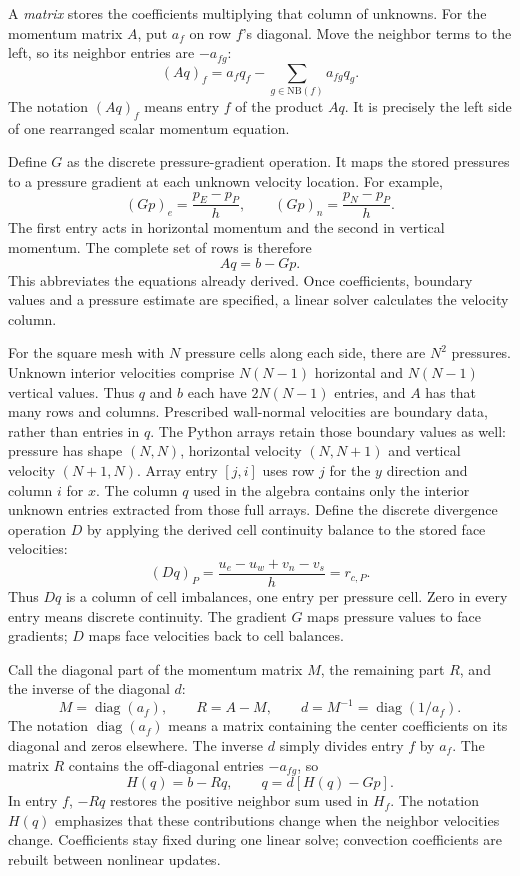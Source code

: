 A \emph{matrix} stores the coefficients multiplying that column of unknowns.
For the momentum matrix $A$, put $a_f$ on row $f$'s diagonal. Move the neighbor
terms to the left, so its neighbor entries are $-a_{fg}$:
\[
(Aq)_f=a_fq_f-\sum_{g\in\mathrm{NB}(f)}a_{fg}q_g.
\]
The notation $(Aq)_f$ means entry $f$ of the product $Aq$. It is precisely
the left side of one rearranged scalar momentum equation.

Define $G$ as the discrete pressure-gradient operation. It maps the stored
pressures to a pressure gradient at each unknown velocity location. For example,
\[
(Gp)_e=\frac{p_E-p_P}{h},\qquad
(Gp)_n=\frac{p_N-p_P}{h}.
\]
The first entry acts in horizontal momentum and the second in vertical
momentum. The complete set of rows is therefore
\[
\boxed{Aq=b-Gp.}
\]
This abbreviates the equations already derived. Once coefficients, boundary
values and a pressure estimate are specified, a linear solver calculates
the velocity column.

For the square mesh with $N$ pressure cells along each side, there are $N^2$
pressures. Unknown interior velocities comprise $N(N-1)$ horizontal and
$N(N-1)$ vertical values. Thus $q$ and $b$ each have $2N(N-1)$ entries,
and $A$ has that many rows and columns. Prescribed wall-normal velocities
are boundary data, rather than entries in $q$.
The Python arrays retain those boundary values as well: pressure has shape
$(N,N)$, horizontal velocity $(N,N+1)$ and vertical velocity $(N+1,N)$.
Array entry $[j,i]$ uses row $j$ for the $y$ direction and column $i$ for $x$.
The column $q$ used in the algebra contains only the interior unknown entries
extracted from those full arrays.
\newpage
{}
Define the discrete divergence operation $D$ by applying the derived cell
continuity balance to the stored face velocities:
\[
(Dq)_P=\frac{u_e-u_w+v_n-v_s}{h}=r_{c,P}.
\]
Thus $Dq$ is a column of cell imbalances, one entry per pressure cell.
Zero in every entry means discrete continuity. The gradient $G$ maps pressure
values to face gradients; $D$ maps face velocities back to cell balances.

Call the diagonal part of the momentum matrix $M$, the remaining part $R$,
and the inverse of the diagonal $d$:
\[
M=\operatorname{diag}(a_f),\qquad R=A-M,\qquad
d=M^{-1}=\operatorname{diag}(1/a_f).
\]
The notation $\operatorname{diag}(a_f)$ means a matrix containing the center
coefficients on its diagonal and zeros elsewhere. The inverse $d$ simply
divides entry $f$ by $a_f$. The matrix $R$ contains the off-diagonal entries
$-a_{fg}$, so
\[
H(q)=b-Rq,\qquad q=d[H(q)-Gp].
\]
In entry $f$, $-Rq$ restores the positive neighbor sum used in $H_f$.
The notation $H(q)$ emphasizes that these contributions change when the
neighbor velocities change. Coefficients stay fixed during one linear solve;
convection coefficients are rebuilt between nonlinear updates.

